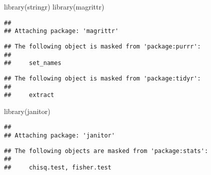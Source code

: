 \documentclass[
]{book}
\newenvironment{Shaded}{\begin{snugshade}}{\end{snugshade}}
\newcommand{\FunctionTok}[1]{\textcolor[rgb]{0.00,0.00,0.00}{#1}}
\newcommand{\NormalTok}[1]{#1}
\begin{document}
\begin{Shaded}
\begin{Highlighting}[]
\FunctionTok{library}\NormalTok{(stringr)}
\FunctionTok{library}\NormalTok{(magrittr)}
\end{Highlighting}
\end{Shaded}

\begin{verbatim}
## 
## Attaching package: 'magrittr'
\end{verbatim}

\begin{verbatim}
## The following object is masked from 'package:purrr':
## 
##     set_names
\end{verbatim}

\begin{verbatim}
## The following object is masked from 'package:tidyr':
## 
##     extract
\end{verbatim}

\begin{Shaded}
\begin{Highlighting}[]
\FunctionTok{library}\NormalTok{(janitor)}
\end{Highlighting}
\end{Shaded}

\begin{verbatim}
## 
## Attaching package: 'janitor'
\end{verbatim}

\begin{verbatim}
## The following objects are masked from 'package:stats':
## 
##     chisq.test, fisher.test
\end{verbatim}
\end{document}
